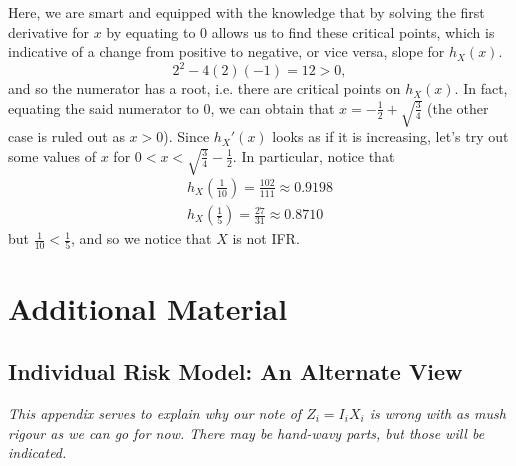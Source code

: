 \documentclass[notoc,notitlepage]{tufte-book}
\begin{document}
\begin{solution}
\begin{enumerate}
{      Here, we are smart and equipped with the knowledge that by solving the first derivative for $x$ by equating to $0$ allows us to find these critical points, which is indicative of a change from positive to negative, or vice versa, slope for $h_X(x)$.}
      \begin{equation*}
        2^2 - 4(2)(-1) = 12 > 0,
      \end{equation*}
      and so the numerator has a root, i.e. there are critical points on $h_X(x)$. In fact, equating the said numerator to $0$, we can obtain that $x = - \frac{1}{2} + \sqrt{\frac{3}{4}}$ (the other case is ruled out as $x > 0$). Since $h_X'(x)$ looks as if it is increasing, let's try out some values of $x$ for $0 < x < \sqrt{\frac{3}{4}} - \frac{1}{2}$. In particular, notice that
      \begin{gather*}
        h_X \left( \frac{1}{10} \right) = \frac{102}{111} \approx 0.9198 \\
        h_X \left( \frac{1}{5} \right) = \frac{27}{31} \approx 0.8710
      \end{gather*}
      but $\frac{1}{10} < \frac{1}{5}$, and so we notice that $X$ is not IFR.
  \end{enumerate}
\end{solution}



\appendix

\chapter{Additional Material}%
\label{chp:additional_material}

\section{Individual Risk Model: An Alternate View}%
\label{sec:individual_risk_model_an_alternate_view}

\textit{This appendix serves to explain why our note of $Z_i = I_i X_i$ is wrong with as mush rigour as we can go for now. There may be hand-wavy parts, but those will be indicated.} 
\end{document}
